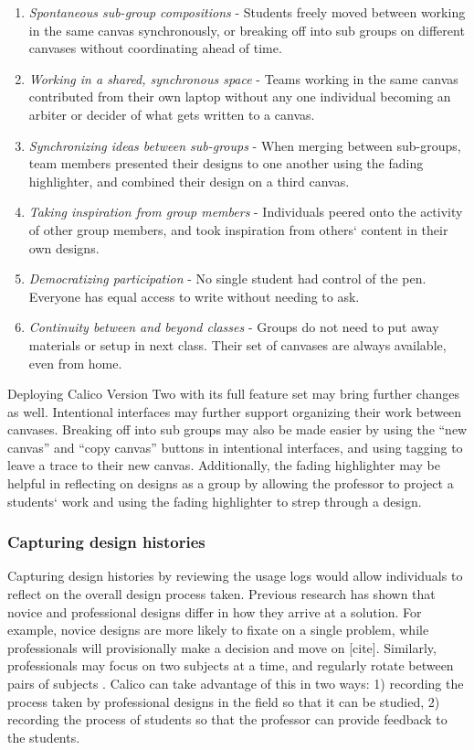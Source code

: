 \begin{enumerate}
	\item \textit{Spontaneous sub-group compositions} - Students freely moved between working in the same canvas synchronously, or breaking off into sub groups on different canvases without coordinating ahead of time.
	\item \textit{Working in a shared, synchronous space} - Teams working in the same canvas contributed from their own laptop without any one individual becoming an arbiter or decider of what gets written to a canvas.
	\item \textit{Synchronizing ideas between sub-groups} - When merging between sub-groups, team members presented their designs to one another using the fading highlighter, and combined their design on a third canvas.
	\item \textit{Taking inspiration from group members} - Individuals peered onto the activity of other group members, and took inspiration from others` content in their own designs.
	\item \textit{Democratizing participation} - No single student had control of the pen. Everyone has equal access to write without needing to ask.
	\item \textit{Continuity between and beyond classes} - Groups do not need to put away materials or setup in next class. Their set of canvases are always available, even from home.
\end{enumerate}

Deploying Calico Version Two with its full feature set may bring further changes as well. Intentional interfaces may further support organizing their work between canvases. Breaking off into sub groups may also be made easier by using the ``new canvas'' and ``copy canvas'' buttons in intentional interfaces, and using tagging to leave a trace to their new canvas. Additionally, the fading highlighter may be helpful in reflecting on designs as a group by allowing the professor to project a students` work and using the fading highlighter to strep through a design.

\subsubsection{Capturing design histories}

Capturing design histories by reviewing the usage logs would allow individuals to reflect on the overall design process taken. Previous research has shown that novice and professional designs differ in how they arrive at a solution. For example, novice designs are more likely to fixate on a single problem, while professionals will provisionally make a decision and move on [cite]. Similarly, professionals may focus on two subjects at a time, and regularly rotate between pairs of subjects \cite{Baker2010590}. 
Calico can take advantage of this in two ways: 1) recording the process taken by professional designs in the field so that it can be studied, 2) recording the process of students so that the professor can provide feedback to the students.

